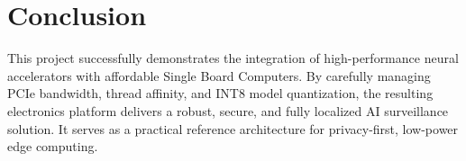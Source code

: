 \documentclass[a4paper,12pt]{article}
\begin{document}
\section{Conclusion}
This project successfully demonstrates the integration of high-performance neural accelerators with affordable Single Board Computers. By carefully managing PCIe bandwidth, thread affinity, and INT8 model quantization, the resulting electronics platform delivers a robust, secure, and fully localized AI surveillance solution. It serves as a practical reference architecture for privacy-first, low-power edge computing.
\end{document}
